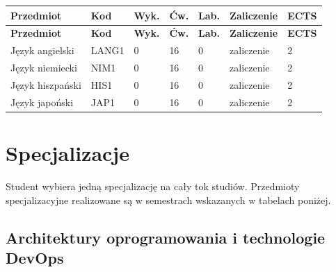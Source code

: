 \documentclass[12pt,a4paper]{article}
\newcommand{\thdrule}{\noalign{\global\setlength{\extrarowheight}{0pt}}}
\newcommand{\thdend}{\noalign{\global\setlength{\extrarowheight}{4pt}}}
\begin{document}
{\scriptsize
\begin{longtable}{m{5.5cm}m{0.8cm}m{1cm}m{1cm}m{1cm}m{1.7cm}m{0.7cm}}
\thdrule\toprule
\rowcolor{pjatkRed}
{\color{white}\footnotesize\textbf{\vphantom{Ag}Przedmiot}} & {\color{white}\footnotesize\textbf{\vphantom{Ag}Kod}} & {\color{white}\footnotesize\textbf{\vphantom{Ag}Wyk.}} & {\color{white}\footnotesize\textbf{\vphantom{Ag}Ćw.}} & {\color{white}\footnotesize\textbf{\vphantom{Ag}Lab.}} & {\color{white}\footnotesize\textbf{\vphantom{Ag}Zaliczenie}} & {\color{white}\footnotesize\textbf{\vphantom{Ag}ECTS}} \\
\midrule\thdend
\endfirsthead
\thdrule\toprule
\rowcolor{pjatkRed}
{\color{white}\footnotesize\textbf{\vphantom{Ag}Przedmiot}} & {\color{white}\footnotesize\textbf{\vphantom{Ag}Kod}} & {\color{white}\footnotesize\textbf{\vphantom{Ag}Wyk.}} & {\color{white}\footnotesize\textbf{\vphantom{Ag}Ćw.}} & {\color{white}\footnotesize\textbf{\vphantom{Ag}Lab.}} & {\color{white}\footnotesize\textbf{\vphantom{Ag}Zaliczenie}} & {\color{white}\footnotesize\textbf{\vphantom{Ag}ECTS}} \\
\midrule\thdend
\endhead
\rowcolor{tableRowLight} Język angielski & LANG1 & 0 & 16 & 0 & {\scriptsize zaliczenie} & 2 \\
\rowcolor{tableRowAlt} Język niemiecki & NIM1 & 0 & 16 & 0 & {\scriptsize zaliczenie} & 2 \\
\rowcolor{tableRowLight} Język hiszpański & HIS1 & 0 & 16 & 0 & {\scriptsize zaliczenie} & 2 \\
\rowcolor{tableRowAlt} Język japoński & JAP1 & 0 & 16 & 0 & {\scriptsize zaliczenie} & 2 \\
\bottomrule
\end{longtable}}



\newpage

\section{Specjalizacje}

Student wybiera jedną specjalizację na cały tok studiów. Przedmioty specjalizacyjne realizowane są w semestrach wskazanych w tabelach poniżej.

\subsection*{Architektury oprogramowania i technologie DevOps}
\end{document}
